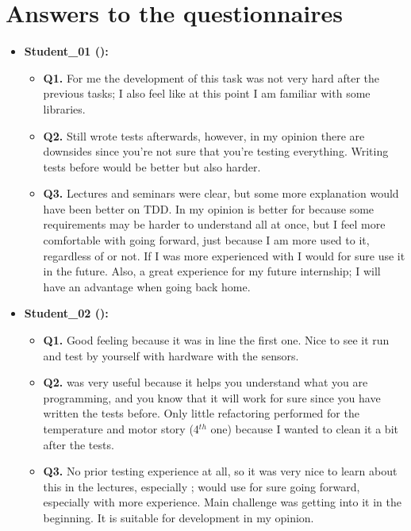 \section{Answers to the questionnaires}
\begin{itemize}
    \item \textbf{Student\_01 (\tdd):}
    \begin{itemize}
        \item \textbf{Q1.} For me the development of this task was not very hard after the previous tasks; I also feel like at this point I am familiar with some libraries.
        \item \textbf{Q2.} Still wrote tests afterwards, however, in my opinion there are downsides since you're not sure that you're testing everything. Writing tests before would be better but also harder.
        \item \textbf{Q3.} Lectures and seminars were clear, but some more explanation would have been better on TDD. In my opinion \tdd is better for \ess because some requirements may be harder to understand all at once, but I feel more comfortable with \notdd going forward, just because I am more used to it, regardless of \es or not. If I was more experienced with \tdd I would for sure use it in the future. Also, a great experience for my future internship; I will have an advantage when going back home.
    \end{itemize}

    \item \textbf{Student\_02 (\tdd):}
    \begin{itemize}
        \item \textbf{Q1.} Good feeling because it was in line the first one. Nice to see it run and test by yourself with hardware with the sensors.
        \item \textbf{Q2.} \tdd was very useful because it helps you understand what you are programming, and you know that it will work for sure since you have written the tests before. Only little refactoring performed for the temperature and motor story (4$^{th}$ one) because I wanted to clean it a bit after the tests.
        \item \textbf{Q3.} No prior testing experience at all, so it was very nice to learn about this in the lectures, especially \tdd; would use \tdd for sure going forward, especially with more experience. Main challenge was getting into it in the beginning. It is suitable for \ess development in my opinion.
    \end{itemize}


\end{itemize}

